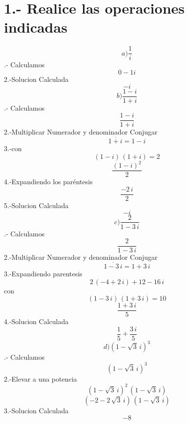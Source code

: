 \documentclass{article}
\begin{document}
\begin{titlepage}
    \centering
    \vspace*{2cm}
    \vspace{1cm}
    {\Huge Instituto Politécnico Nacional} 
    \vspace{0.3cm}

    
    {\Large Escuela Superior de Cómputo} 
    \vspace{3cm}
    
    {\Huge \textbf{Matematicas Avanzadas para la Ingenieria}} 
    \vspace{2cm}
    
    {\Large Ejercicios Propuestos 21 de Marzo}
    \vspace{0.5cm}
    
    {\Large Integrantes:}\\
    \vspace{0.3cm}
    {\large 
    Vazquez Blancas Cesar Said\\
    
    \vfill
    
    {\large 3 de Abril de 2024}
\end{titlepage}
\newpage 

\section*{1.- Realice las operaciones indicadas }
\newline
\[
a) \frac{1}{i}
\]
.- Calculamos
\[
0-1i
\]
2.-Solucion Calculada
\[
-i
\]
\newline
\[
b) \frac{1-i}{1+i}
\]
.- Calculamos
\[
\dfrac{1-i}{1+i}
\]
2.-Multiplicar
Numerador y denominador
Conjugar
\[
\overline{1+i}=1-i
\]
3.-con
\[
\left(1-i\right)\,\left(1+i\right)=2
\]
\[
\dfrac{\left(1-i\right)^{2}}{2}
\]
4.-Expandiendo los paréntesis
\[
\dfrac{-2\,i}{2}
\]
5.-Solucion Calculada
\[
-i
\]
\newline
\[
c)\dfrac{2}{1-3\,i}
\]
.- Calculamos
\[
\dfrac{2}{1-3\,i}
\]
2.-Multiplicar
Numerador y denominador
Conjugar
\[
\overline{1-3\,i}=1+3\,i
\]
3.-Expandiendo parentesis
\[
2\,\left(-4+2\,i\right)+12-16\,i
\]
con
\[
\left(1-3\,i\right)\,\left(1+3\,i\right)=10
\]
\[
\dfrac{1+3\,i}{5}
\]
4.-Solucion Calculada
\[
\dfrac{1}{5}+\dfrac{3\,i}{5}
\]
\newline
\[
d)\left(1-\sqrt{3}\,i\right)^{3}
\]
.- Calculamos
\[
\left(1-\sqrt{3}\,i\right)^{3}
\]
2.-Elevar a una potencia
\[
\left(1-\sqrt{3}\,i\right)^{2}\,\left(1-\sqrt{3}\,i\right)
\]
\[
\left(-2-2\,\sqrt{3}\,i\right)\,\left(1-\sqrt{3}\,i\right)
\]
3.-Solucion Calculada
\[
-8
\]
\end{document}
